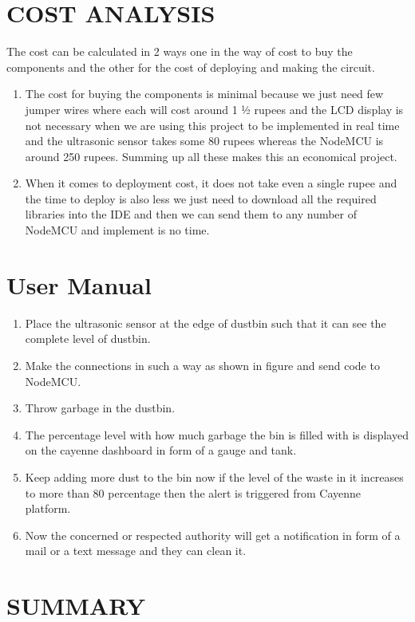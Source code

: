 \documentclass[12pt,letterpaper]{article}
\begin{document}
\section{COST ANALYSIS}
The cost can be calculated in 2 ways one in the way of cost to buy the components and the other for the cost of deploying and making the circuit.
\begin{enumerate}
    \item The cost for buying the components is minimal because we just need few jumper wires where each will cost around 1 ½ rupees and the LCD display is not necessary when we are using this project to be implemented in real time and the ultrasonic sensor takes some 80 rupees whereas the NodeMCU is around 250 rupees. Summing up all these makes this an economical project. 
    \item When it comes to deployment cost, it does not take even a single rupee and the time to deploy is also less we just need to download all the required libraries into the IDE and then we can send them to any number of NodeMCU and implement is no time.
\end{enumerate}

\newpage
\section{User Manual}
\begin{enumerate}
\item Place the ultrasonic sensor at the edge of dustbin such that it can see the complete level of dustbin.
\item Make the connections in such a way as shown in figure and send code to NodeMCU.
\item Throw garbage in the dustbin.
\item The percentage level with how much garbage the bin is filled with is displayed on the cayenne dashboard in form of a gauge and tank.
\item Keep adding more dust to the bin now if the level of the waste in it increases to more than 80 percentage then the alert is triggered from Cayenne platform.
\item Now the concerned or respected authority will get a notification in form of a mail or a text message and they can clean it.
\end{enumerate}

\newpage
\section{SUMMARY}
\end{document}
